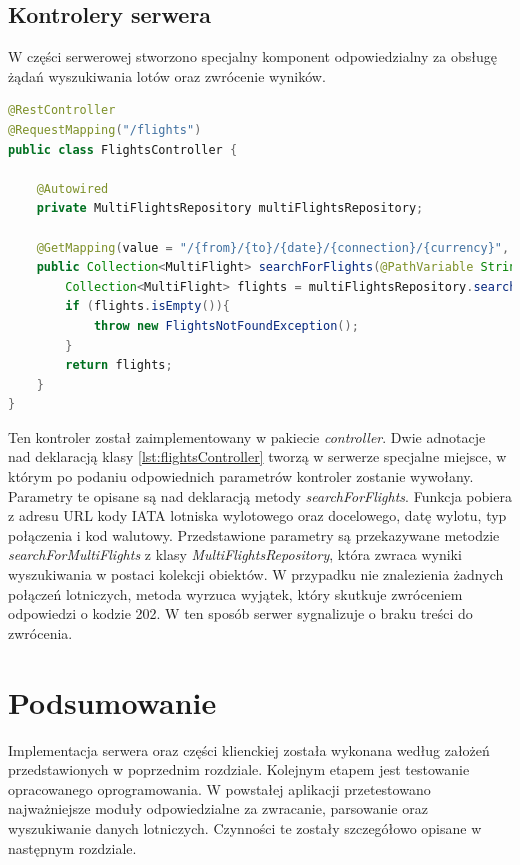 \documentclass[12pt, twoside]{report}
\begin{document}
\subsection{Kontrolery serwera}
W części serwerowej stworzono specjalny komponent odpowiedzialny za obsługę żądań wyszukiwania lotów oraz zwrócenie wyników. 
\begin{lstlisting}[language=java, caption=Kontroler zwracający wyniki wyszukiwania lotów, label=lst:flightsController]
@RestController
@RequestMapping("/flights")
public class FlightsController {

    @Autowired
    private MultiFlightsRepository multiFlightsRepository;

    @GetMapping(value = "/{from}/{to}/{date}/{connection}/{currency}", produces = MediaType.APPLICATION_JSON_VALUE)
    public Collection<MultiFlight> searchForFlights(@PathVariable String from, @PathVariable String to, @PathVariable String date, @PathVariable String connection, @PathVariable String currency) throws AirportsNotFoundException, IOException {
        Collection<MultiFlight> flights = multiFlightsRepository.searchForMultiFlights(from, to, date, connection, currency);
        if (flights.isEmpty()){
            throw new FlightsNotFoundException();
        }
        return flights;
    }
}
\end{lstlisting}
Ten kontroler został zaimplementowany w pakiecie \textit{controller}. Dwie adnotacje nad deklaracją klasy \ref{lst:flightsController} tworzą w serwerze specjalne miejsce, w którym po podaniu odpowiednich parametrów kontroler zostanie wywołany. Parametry te opisane są nad deklaracją metody \textit{searchForFlights}. Funkcja pobiera z adresu URL kody IATA lotniska wylotowego oraz docelowego, datę wylotu, typ połączenia i kod walutowy. Przedstawione parametry są przekazywane metodzie \textit{searchForMultiFlights} z klasy \textit{MultiFlightsRepository}, która zwraca wyniki wyszukiwania w postaci kolekcji obiektów. W przypadku nie znalezienia żadnych połączeń lotniczych, metoda wyrzuca wyjątek, który skutkuje zwróceniem odpowiedzi o kodzie 202. W ten sposób serwer sygnalizuje o braku treści do zwrócenia.

\section{Podsumowanie}
Implementacja serwera oraz części klienckiej została wykonana według założeń przedstawionych w poprzednim rozdziale. Kolejnym etapem jest testowanie opracowanego oprogramowania. W powstałej aplikacji przetestowano najważniejsze moduły odpowiedzialne za zwracanie, parsowanie oraz wyszukiwanie danych lotniczych. Czynności te zostały szczegółowo opisane w następnym rozdziale.
\end{document}
